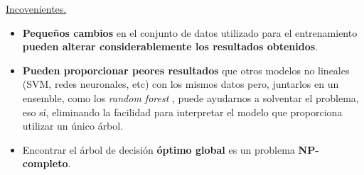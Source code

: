 \underline{Incovenientes.}
\begin{itemize}
	\item \textbf{Pequeños cambios} en el conjunto de datos utilizado para el entrenamiento \textbf{pueden alterar considerablemente los resultados obtenidos}.
	\item \textbf{Pueden proporcionar peores resultados} que otros modelos no lineales (SVM, redes neuronales, etc) con los mismos datos pero, juntarlos en un ensemble, como los \textit{random forest} \cite{randomforest}, puede ayudarnos a solventar el problema, eso sí, eliminando la facilidad para interpretar el modelo que proporciona utilizar un único árbol.
	\item Encontrar el árbol de decisión \textbf{óptimo global} es un problema \textbf{NP-completo}.
\end{itemize}
